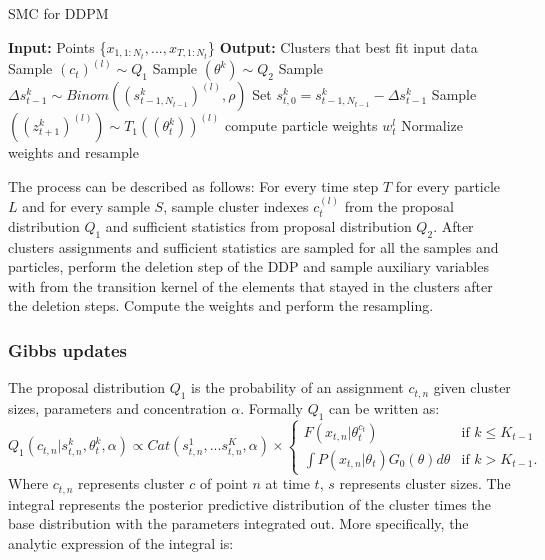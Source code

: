 \documentclass[twoside,hidelinks]{article}
\begin{document}
\begin{algorithm}[ht!]
  \caption{SMC for DDPM}\label{SMC}
  \begin{algorithmic}[1]
	\State \textbf{Input:} Points \{$x_{1,1:N_t}, ..., x_{T,1:N_t}$\}
	\State \textbf{Output:} Clusters that best fit input data
								\State Sample $(c_t)^{(l)} \sim Q_1$  
								\State Sample $(\theta^k ) \sim Q_2$
						    \EndFor		
			   \State Sample $\Delta s_{t-1}^k \sim Binom( (s_{t-1,N_{t-1}}^k)^{(l)}, \rho) $ 
		       \State Set $s_{t,0}^{k} = s_{t-1,N_{t-1}}^{k} -\Delta s_{t-1}^k$
   		       \State Sample $( (z_{t+1}^k)^{(l)} ) \sim T_1((\theta_t^k))^{(l)} $
		    \EndFor
		 	\State compute particle weights $w_t^l$
		    \EndFor
    \State Normalize weights and resample
    \EndFor
  \end{algorithmic}
\end{algorithm}

The process can be described as follows:
For every time step $T$ for every particle $L$ and for every sample $S$, sample cluster indexes $c_t^{(l)}$ from the proposal distribution $Q_1$ and sufficient statistics from proposal distribution $Q_2$. After clusters assignments and sufficient statistics are sampled for all the samples and particles, perform the deletion step of the DDP and sample auxiliary variables with from the transition kernel of the elements that stayed in the clusters after the deletion steps. Compute the weights and perform the resampling. 

\subsubsection{Gibbs updates}
The proposal distribution $Q_1$ is the probability of an assignment $c_{t,n}$ given cluster sizes, parameters and concentration $\alpha$. Formally $Q_1$ can be written as:
\begin{equation} \label{Gibbs}
 Q_1(c_{t,n} | s_{t,n}^k, \theta_t^k, \alpha) \propto Cat( s_{t,n}^1,...s_{t,n}^K, \alpha ) \times
 	\begin{cases} 
 	F(x_{t,n} | \theta_t^{c_t} )  &\mbox{if } k \leq K_{t-1} \\
 	\int P(x_{t,n} | \theta_t )G_0(\theta) d\theta & \mbox{if } k > K_{t-1}. \end{cases}
\end{equation}
Where $c_{t,n}$ represents cluster $c$ of point $n$ at time $t$, $s$ represents cluster sizes. The integral represents the posterior predictive distribution of the cluster times the base distribution with the parameters integrated out. More specifically, the analytic expression of the integral is:
\end{document}
